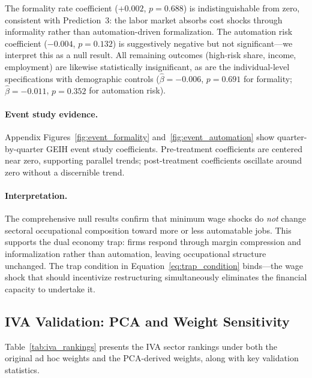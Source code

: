 \documentclass[5p,times,authoryear]{elsarticle}
\begin{document}
The formality rate coefficient ($+0.002$, $p = 0.688$) is indistinguishable from zero, consistent with Prediction~3: the labor market absorbs cost shocks through informality rather than automation-driven formalization. The automation risk coefficient ($-0.004$, $p = 0.132$) is suggestively negative but not significant---we interpret this as a null result. All remaining outcomes (high-risk share, income, employment) are likewise statistically insignificant, as are the individual-level specifications with demographic controls ($\hat{\beta} = -0.006$, $p = 0.691$ for formality; $\hat{\beta} = -0.011$, $p = 0.352$ for automation risk).

\paragraph{Event study evidence.} Appendix Figures~\ref{fig:event_formality} and~\ref{fig:event_automation} show quarter-by-quarter GEIH event study coefficients. Pre-treatment coefficients are centered near zero, supporting parallel trends; post-treatment coefficients oscillate around zero without a discernible trend.

\paragraph{Interpretation.} The comprehensive null results confirm that minimum wage shocks do \emph{not} change sectoral occupational composition toward more or less automatable jobs. This supports the dual economy trap: firms respond through margin compression and informalization rather than automation, leaving occupational structure unchanged. The trap condition in Equation~\eqref{eq:trap_condition} binds---the wage shock that should incentivize restructuring simultaneously eliminates the financial capacity to undertake it.

\FloatBarrier

\subsection{IVA Validation: PCA and Weight Sensitivity}
\label{subsec:results_iva}

Table~\ref{tab:iva_rankings} presents the IVA sector rankings under both the original ad hoc weights and the PCA-derived weights, along with key validation statistics.
\end{document}
